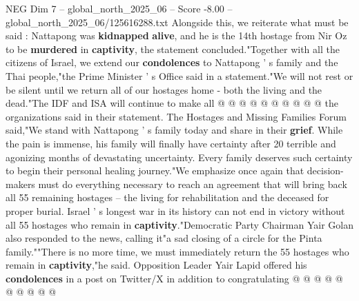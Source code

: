 \begin{textsample}{NEG Dim 7 – global\_north\_2025\_06 – Score -8.00 – global\_north\_2025\_06/125616288.txt}
Alongside this, we reiterate what must be said : Nattapong was \textbf{kidnapped} \textbf{alive}, and he is the 14th hostage from Nir Oz to be \textbf{murdered} in \textbf{captivity}, the statement concluded."Together with all the citizens of Israel, we extend our \textbf{condolences} to Nattapong ' s family and the Thai people,"the Prime Minister ' s Office said in a statement."We will not rest or be silent until we return all of our hostages home - both the living and the dead."The IDF and ISA will continue to make all @ @ @ @ @ @ @ @ @ @ the organizations said in their statement.
The Hostages and Missing Families Forum said,"We stand with Nattapong ' s family today and share in their \textbf{grief}.
While the pain is immense, his family will finally have certainty after 20 terrible and agonizing months of devastating uncertainty.
Every family deserves such certainty to begin their personal healing journey."We emphasize once again that decision-makers must do everything necessary to reach an agreement that will bring back all 55 remaining hostages -- the living for rehabilitation and the deceased for proper burial.
Israel ' s longest war in its history can not end in victory without all 55 hostages who remain in \textbf{captivity}."Democratic Party Chairman Yair Golan also responded to the news, calling it"a sad closing of a circle for the Pinta family.""There is no more time, we must immediately return the 55 hostages who remain in \textbf{captivity},"he said.
Opposition Leader Yair Lapid offered his \textbf{condolences} in a post on Twitter/X in addition to congratulating @ @ @ @ @ @ @ @ @ @

\end{textsample}
